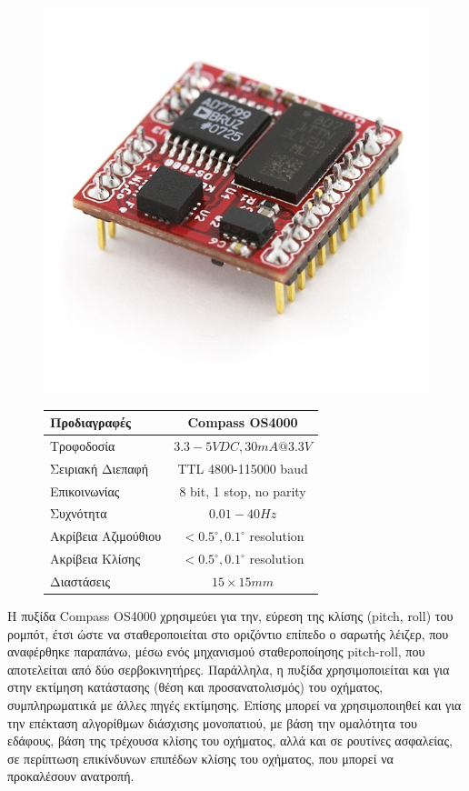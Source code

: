 \begin{enumerate}
\begin{figure}[!ht]
	\begin{minipage}[b]{0.45\textwidth}
		\centering
		\includegraphics[width=0.5\linewidth]{Chapters/Chapter2/Figures/compassOS4000.jpg}
		\label{fig:compassOS4000}
	\end{minipage}		
	\begin{minipage}[b]{0.54\textwidth}
		\centering
		\begin{tabular}{| l | c |}
			\hline
			\textbf{Προδιαγραφές} & \textbf{Compass OS4000}\\ \hline
			Τροφοδοσία & $3.3-5VDC, 30mA @ 3.3V$\\ \hline
			Σειριακή Διεπαφή& TTL 4800-115000 baud\\
			Επικοινωνίας  & 8 bit, 1 stop, no parity\\ \hline
			Συχνότητα & $0.01-40Hz$\\ \hline
			Ακρίβεια Αζιμούθιου & $<0.5^{\circ}, 0.1^{\circ}$ resolution\\ \hline
			Ακρίβεια Κλίσης & $<0.5^{\circ}, 0.1^{\circ}$ resolution\\ \hline
			Διαστάσεις & $15 \times 15 mm$\\ \hline
		\end{tabular}
		\label{tab:compassOS4000}
	\end{minipage}
\end{figure}

Η {πυξίδα Compass OS4000} χρησιμεύει για την, εύρεση της κλίσης (pitch, roll) του ρομπότ, έτσι ώστε να σταθεροποιείται στο οριζόντιο επίπεδο ο {σαρωτής λέιζερ}, που αναφέρθηκε παραπάνω, μέσω ενός μηχανισμού σταθεροποίησης pitch-roll, που αποτελείται από δύο σερβοκινητήρες. Παράλληλα, η πυξίδα χρησιμοποιείται και για στην εκτίμηση κατάστασης (θέση και προσανατολισμός) του οχήματος, συμπληρωματικά με άλλες πηγές εκτίμησης. Επίσης μπορεί να χρησιμοποιηθεί και για την επέκταση αλγορίθμων διάσχισης μονοπατιού, με βάση την ομαλότητα του εδάφους, βάση της τρέχουσα κλίσης του οχήματος, αλλά και σε ρουτίνες ασφαλείας, σε περίπτωση επικίνδυνων επιπέδων κλίσης του οχήματος, που μπορεί να προκαλέσουν ανατροπή.


\end{enumerate}
